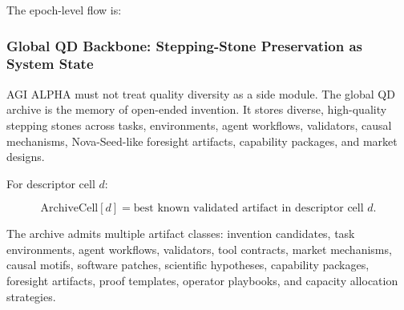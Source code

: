 The epoch-level flow is:

\begin{Shaded}
\begin{Highlighting}[]
\end{Highlighting}
\end{Shaded}

\subsubsection{Global QD Backbone: Stepping-Stone Preservation as System
State}\label{global-qd-backbone-stepping-stone-preservation-as-system-state}

AGI ALPHA must not treat quality diversity as a side module. The global
QD archive is the memory of open-ended invention. It stores diverse,
high-quality stepping stones across tasks, environments, agent
workflows, validators, causal mechanisms, Nova-Seed-like foresight
artifacts, capability packages, and market designs.

For descriptor cell \(d\):

\[
\mathrm{ArchiveCell}[d]
=
\text{best known validated artifact in descriptor cell } d.
\]

The archive admits multiple artifact classes: invention candidates, task
environments, agent workflows, validators, tool contracts, market
mechanisms, causal motifs, software patches, scientific hypotheses,
capability packages, foresight artifacts, proof templates, operator
playbooks, and capacity allocation strategies.


